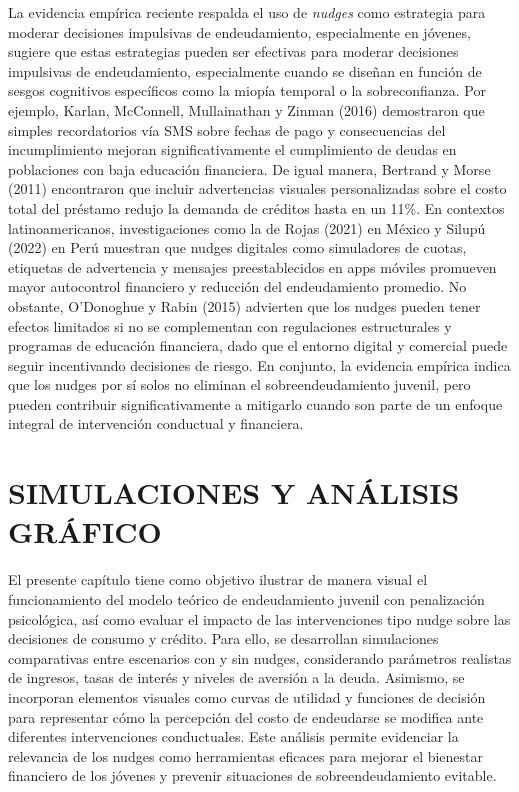 \documentclass[10pt]{article}
\begin{document}
\begin{multicols}{2}
La evidencia empírica reciente respalda el uso de \textit{nudges} como estrategia para moderar decisiones impulsivas de endeudamiento, especialmente en jóvenes, sugiere que estas estrategias pueden ser efectivas para moderar decisiones impulsivas de endeudamiento, especialmente cuando se diseñan en función de sesgos cognitivos específicos como la miopía temporal o la sobreconfianza. Por ejemplo, Karlan, McConnell, Mullainathan y Zinman (2016) demostraron que simples recordatorios vía SMS sobre fechas de pago y consecuencias del incumplimiento mejoran significativamente el cumplimiento de deudas en poblaciones con baja educación financiera. De igual manera, Bertrand y Morse (2011) encontraron que incluir advertencias visuales personalizadas sobre el costo total del préstamo redujo la demanda de créditos hasta en un 11\%. En contextos latinoamericanos, investigaciones como la de Rojas (2021) en México y Silupú (2022) en Perú muestran que nudges digitales como simuladores de cuotas, etiquetas de advertencia y mensajes preestablecidos en apps móviles promueven mayor autocontrol financiero y reducción del endeudamiento promedio. No obstante, O'Donoghue y Rabin (2015) advierten que los nudges pueden tener efectos limitados si no se complementan con regulaciones estructurales y programas de educación financiera, dado que el entorno digital y comercial puede seguir incentivando decisiones de riesgo. En conjunto, la evidencia empírica indica que los nudges por sí solos no eliminan el sobreendeudamiento juvenil, pero pueden contribuir significativamente a mitigarlo cuando son parte de un enfoque integral de intervención conductual y financiera.



\section{SIMULACIONES Y ANÁLISIS GRÁFICO}

El presente capítulo tiene como objetivo ilustrar de manera visual el funcionamiento del modelo teórico de endeudamiento juvenil con penalización psicológica, así como evaluar el impacto de las intervenciones tipo nudge sobre las decisiones de consumo y crédito. Para ello, se desarrollan simulaciones comparativas entre escenarios con y sin nudges, considerando parámetros realistas de ingresos, tasas de interés y niveles de aversión a la deuda. Asimismo, se incorporan elementos visuales como curvas de utilidad y funciones de decisión para representar cómo la percepción del costo de endeudarse se modifica ante diferentes intervenciones conductuales. Este análisis permite evidenciar la relevancia de los nudges como herramientas eficaces para mejorar el bienestar financiero de los jóvenes y prevenir situaciones de sobreendeudamiento evitable.


\end{multicols}
\end{document}
